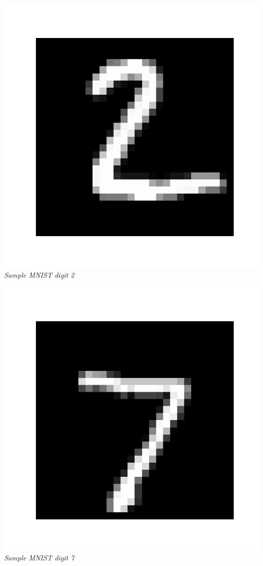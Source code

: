 \documentclass[9pt]{extarticle}
\theoremstyle{plain}
\theoremstyle{definition}
\theoremstyle{remark}
\begin{document}
\begin{minipage}{0.3\textwidth}
    \centering
    \includegraphics[scale = 0.15]{images/2_MNIST.png}
    \\ \textit{Sample MNIST digit 2}
\end{minipage}
\begin{minipage}{0.3\textwidth}
    \centering
    \includegraphics[scale = 0.15]{images/7_MNIST.png}
    \\ \textit{Sample MNIST digit 7}
\end{minipage}
\end{document}
